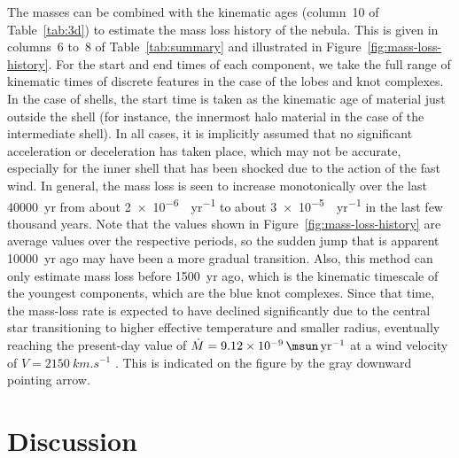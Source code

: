 \documentclass[useAMS, usenatbib]{mnras}
\begin{document}
The masses can be combined with the kinematic ages (column~10 of Table~\ref{tab:3d}) to estimate the mass loss history of the nebula.
This is given in columns~6 to~8 of Table~\ref{tab:summary} and illustrated in Figure~\ref{fig:mass-loss-history}.
For the start and end times of each component, we take the full range of kinematic times of discrete features in the case of the lobes and knot complexes.
In the case of shells, the start time is taken as the kinematic age of material just outside the shell (for instance, the innermost halo material in the case of the intermediate shell).
In all cases, it is implicitly assumed that no significant acceleration or deceleration has taken place,
which may not be accurate, especially for the inner shell that has been shocked due to the action of the fast wind.
In general, the mass loss is seen to increase monotonically over the last \SI{40000}{yr} from about \SI{2e-6}{\msun.yr^{-1}} to about \SI{3e-5}{\msun.yr^{-1}} in the last few thousand years.
Note that the values shown in Figure~\ref{fig:mass-loss-history} are average values over the respective periods,
so the sudden jump that is apparent \SI{10000}{yr} ago may have been a more gradual transition.
Also, this method can only estimate mass loss before \SI{1500}{yr} ago, which is the kinematic timescale of the youngest components,
which are the blue knot complexes.
Since that time, the mass-loss rate is expected to have declined significantly
due to the central star transitioning to higher effective temperature and smaller radius,
eventually reaching the present-day value of \(\dot{M} = \SI{9.12e-9}{\msun.yr^{-1}}\) at a wind velocity of \(V = \SI{2150}{km.s^{-1}}\) \citep{Herald:2011a}.
This is indicated on the figure by the gray downward pointing arrow.




\section{Discussion}
\label{sec:discussion}
\end{document}
